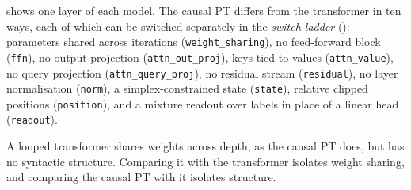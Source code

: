  shows one layer of each model. The causal PT differs from the
transformer in ten ways, each of which can be switched separately in the \emph{switch ladder}
(): parameters
shared across iterations (\texttt{weight\_sharing}), no feed-forward block (\texttt{ffn}), no
output projection (\texttt{attn\_out\_proj}), keys tied to values (\texttt{attn\_value}), no
query projection (\texttt{attn\_query\_proj}), no residual stream (\texttt{residual}), no layer
normalisation (\texttt{norm}), a simplex-constrained state (\texttt{state}), relative clipped
positions (\texttt{position}), and a mixture readout over labels in place of a linear head
(\texttt{readout}).

A looped transformer \citep{dehghani2019universal,giannou2023looped,yang2024looped} shares
weights across depth, as the causal PT does, but has no syntactic structure. Comparing it with the transformer isolates
weight sharing, and comparing the causal PT with it isolates structure.
